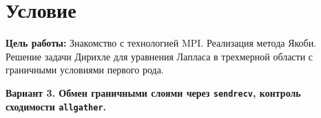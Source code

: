 \section{Условие}
{\bfseries Цель работы:} Знакомство с технологией MPI. Реализация метода Якоби. Решение задачи Дирихле для уравнения Лапласа в трехмерной области с граничными условиями первого рода.

{\bfseries Вариант 3. Обмен граничными слоями через \texttt{sendrecv}, контроль сходимости \texttt{allgather}.}

